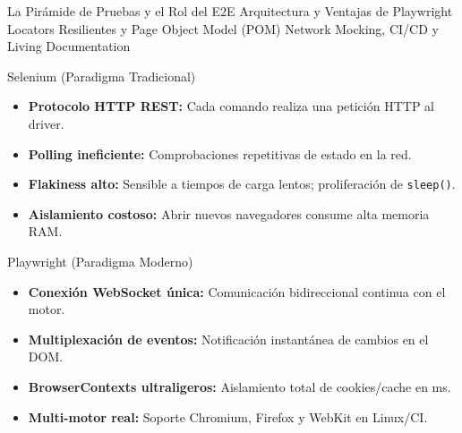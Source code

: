 \documentclass[aspectratio=169]{beamer}
\begin{document}
  {La Pirámide de Pruebas y el Rol del E2E}
  {Arquitectura y Ventajas de Playwright}
  {Locators Resilientes y Page Object Model (POM)}
  {Network Mocking, CI/CD y Living Documentation}


  {Selenium (Paradigma Tradicional)}
  {
    {\footnotesize
    \begin{itemize}
      \item \textbf{Protocolo HTTP REST:} Cada comando realiza una petición HTTP al driver.
      \item \textbf{Polling ineficiente:} Comprobaciones repetitivas de estado en la red.
      \item \textbf{Flakiness alto:} Sensible a tiempos de carga lentos; proliferación de \texttt{sleep()}.
      \item \textbf{Aislamiento costoso:} Abrir nuevos navegadores consume alta memoria RAM.
    \end{itemize}
    }
  }
  {Playwright (Paradigma Moderno)}
  {
    {\footnotesize
    \begin{itemize}
      \item \textbf{Conexión WebSocket única:} Comunicación bidireccional continua con el motor.
      \item \textbf{Multiplexación de eventos:} Notificación instantánea de cambios en el DOM.
      \item \textbf{BrowserContexts ultraligeros:} Aislamiento total de cookies/cache en ms.
      \item \textbf{Multi-motor real:} Soporte Chromium, Firefox y WebKit en Linux/CI.
    \end{itemize}
    }
  }
\end{document}
